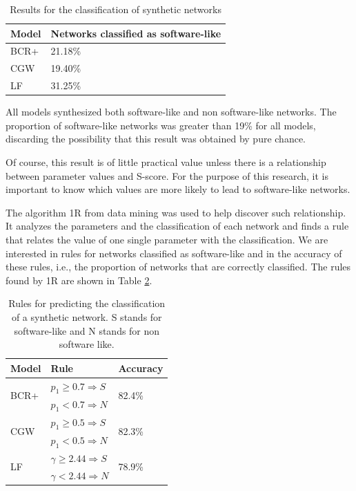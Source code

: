 \begin{table}
\caption{Results for the classification of synthetic networks}
\centering
\begin{tabular}{|l|l|}
\hline
Model & Networks classified as software-like \\
\hline 
\hline
BCR+ & 21.18\% \\ %
\hline
CGW  & 19.40\% \\  %
\hline
LF   & 31.25\% \\ %
\hline
\end{tabular}
\label{tab:results}
\end{table}

All models synthesized both software-like and non software-like networks. The
proportion of software-like networks was greater than 19\% for all models,
discarding the possibility that this result was obtained by pure chance.

%
%
%
%

Of course, this result is of little practical value unless there is a
relationship between parameter values and S-score. For the purpose of this
research, it is important to know which values are more likely to lead to
software-like networks.

The algorithm 1R from data mining was used to help discover such relationship.
It analyzes the parameters and the classification of each network and finds a
rule that relates the value of one single parameter with the classification. We
are interested in rules for networks classified as software-like and in the
accuracy of these rules, i.e., the proportion of networks that are correctly
classified. The rules found by 1R are shown in Table \ref{tab:rules}.

\begin{table}
\caption{Rules for predicting the classification of a synthetic network. S
stands for software-like and N stands for non software like.}
\centering
\begin{tabular}{|l|l|l|}
\hline
Model & Rule & Accuracy \\
\hline 
\hline
\multirow{2}{*}{BCR+}
     & $p_1 \ge 0.7 \Rightarrow S$ & \multirow{2}{*}{82.4\%}  \\ 
     & $p_1 < 0.7 \Rightarrow N$ & \\ 
\hline
\multirow{2}{*}{CGW}
     & $p_1 \ge 0.5 \Rightarrow S$ & \multirow{2}{*}{82.3\%} \\  
     & $p_1 < 0.5 \Rightarrow N$ & \\  
\hline
\multirow{2}{*}{LF}   
     & $\gamma \ge 2.44 \Rightarrow S$ & \multirow{2}{*}{78.9\%} \\ 
     & $\gamma < 2.44 \Rightarrow N$ & \\ 
\hline
\end{tabular}
\label{tab:rules}
\end{table}

